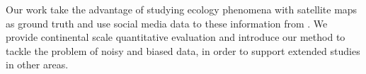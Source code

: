 Our work take the advantage of studying ecology phenomena with  satellite maps as
 ground truth and use social media data to  these information from . We provide continental scale quantitative evaluation and introduce our
 method to tackle the problem of noisy and biased data, in order to support extended studies in other areas. 

